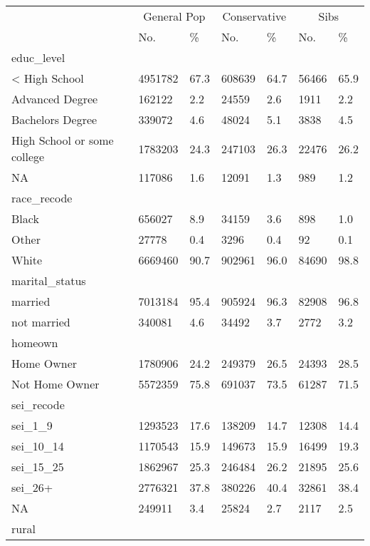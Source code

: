 \captionsetup[table]{labelformat=empty,skip=1pt}
\begin{longtable}{lllllll}
\toprule
& \multicolumn{2}{c}{General Pop} & \multicolumn{2}{c}{Conservative} & \multicolumn{2}{c}{Sibs} \\ 
 \cmidrule(lr){2-3}\cmidrule(lr){4-5}\cmidrule(lr){6-7}
 & No. & \% & No. & \% & No. & \% \\ 
\midrule
\multicolumn{1}{l}{educ\_level} \\ 
\midrule
< High School & 4951782 & 67.3 & 608639 & 64.7 & 56466 & 65.9 \\ 
Advanced Degree & 162122 & 2.2 & 24559 & 2.6 & 1911 & 2.2 \\ 
Bachelors Degree & 339072 & 4.6 & 48024 & 5.1 & 3838 & 4.5 \\ 
High School or some college & 1783203 & 24.3 & 247103 & 26.3 & 22476 & 26.2 \\ 
NA & 117086 & 1.6 & 12091 & 1.3 & 989 & 1.2 \\ 
\midrule
\multicolumn{1}{l}{race\_recode} \\ 
\midrule
Black & 656027 & 8.9 & 34159 & 3.6 & 898 & 1.0 \\ 
Other & 27778 & 0.4 & 3296 & 0.4 & 92 & 0.1 \\ 
White & 6669460 & 90.7 & 902961 & 96.0 & 84690 & 98.8 \\ 
\midrule
\multicolumn{1}{l}{marital\_status} \\ 
\midrule
married & 7013184 & 95.4 & 905924 & 96.3 & 82908 & 96.8 \\ 
not married & 340081 & 4.6 & 34492 & 3.7 & 2772 & 3.2 \\ 
\midrule
\multicolumn{1}{l}{homeown} \\ 
\midrule
Home Owner & 1780906 & 24.2 & 249379 & 26.5 & 24393 & 28.5 \\ 
Not Home Owner & 5572359 & 75.8 & 691037 & 73.5 & 61287 & 71.5 \\ 
\midrule
\multicolumn{1}{l}{sei\_recode} \\ 
\midrule
sei\_1\_9 & 1293523 & 17.6 & 138209 & 14.7 & 12308 & 14.4 \\ 
sei\_10\_14 & 1170543 & 15.9 & 149673 & 15.9 & 16499 & 19.3 \\ 
sei\_15\_25 & 1862967 & 25.3 & 246484 & 26.2 & 21895 & 25.6 \\ 
sei\_26+ & 2776321 & 37.8 & 380226 & 40.4 & 32861 & 38.4 \\ 
NA & 249911 & 3.4 & 25824 & 2.7 & 2117 & 2.5 \\ 
\midrule
\multicolumn{1}{l}{rural} \\ 

\end{longtable}
